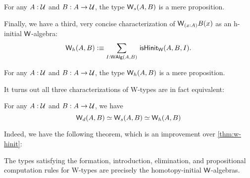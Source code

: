\begin{thm}
For any $A : \mathcal{U}$ and $B : A \to \mathcal{U}$, the type $\mathsf{W}_s (A,B)$ is a mere proposition.
\end{thm}

Finally, we have a third, very concise characterization of $\wtype{x:A} B(x)$ as an h-initial $\mathsf{W}$-algebra:
\begin{equation*}
\w_h(A,B) \defeq \sm{I : \walg(A,B)} \ishinitw(A,B,I).
\end{equation*}

\begin{thm}
For any $A : \mathcal{U}$ and $B : A \to \mathcal{U}$, the type $\mathsf{W}_h (A,B)$ is a mere proposition.
\end{thm}

It turns out all three characterizations of W-types are in fact equivalent:
\begin{lem}\label{lem:homotopy-induction-times-3}
For any $A : \mathcal{U}$ and $B : A \to \mathcal{U}$, we have
\[ \mathsf{W}_d(A,B) \simeq \mathsf{W}_s(A,B) \simeq \mathsf{W}_h(A,B) \]
\end{lem}

Indeed, we have the following theorem, which is an improvement over \autoref{thm:w-hinit}:

\begin{thm}
The types satisfying the formation, introduction, elimination, and propositional computation rules for W-types are precisely the homotopy-initial $\mathsf{W}$-algebras.
\end{thm}

